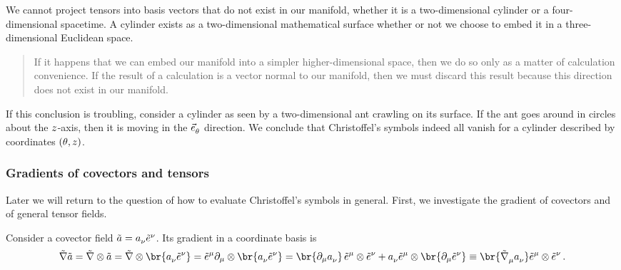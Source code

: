  We cannot project tensors into basis vectors that do not exist in our manifold, whether it is a two-dimensional cylinder or a four-dimensional spacetime. A cylinder exists as a two-dimensional mathematical surface whether or not we choose to embed it in a three-dimensional Euclidean space. 
%
\begin{quotation}
  If it happens that we can embed our manifold into a simpler higher-dimensional space, then we do so only as a matter of calculation convenience. If the result of a calculation is a vector normal to our manifold, then we must discard this result because this direction does not exist in our manifold.
\end{quotation}
%
 If this conclusion is troubling, consider a cylinder as seen by a two-dimensional ant crawling on its surface. If the ant goes around in circles about the $z$-axis, then it is moving in the $\tbvec\cypos$ direction. We conclude that Christoffel's symbols indeed all vanish for a cylinder described by coordinates $\tuple{\cypos,\czpos}$.


\subsubsection{Gradients of covectors and tensors}
%
Later we will return to the question of how to evaluate Christoffel's symbols in general. First, we investigate the gradient of covectors and of general tensor fields. 

 Consider a covector field $\cov a = \tcov a\nu\tbcov\nu$. Its gradient in a coordinate basis is
%
\begin{equation}\label{eq:gradientofcovector}
  \gradcov\cov a = \gradcov\tprod\cov a
                = \gradcov\tprod\br{\tcov a\nu\tbcov\nu}
                = \tbcov\mu\ipd\mu\tprod\br{\tcov a\nu\tbcov\nu}
                = \br{\ipd\mu\tcov a\nu}\,\tbcov\mu\tprod\tbcov\nu
                  + \tcov a\nu\tbcov\mu\tprod\br{\ipd\mu\tbcov\nu}
                \defas \br{\tgradcov\mu\tcov a\nu}\tbcov\mu\tprod\tbcov\nu\,.
\end{equation}

